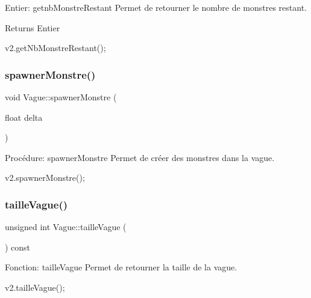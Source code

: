 Entier\+: getnb\+Monstre\+Restant Permet de retourner le nombre de monstres restant. 

\begin{DoxyReturn}{Returns}
Entier 
\begin{DoxyCode}
v2.getNbMonstreRestant();
\end{DoxyCode}
 
\end{DoxyReturn}
\mbox{\label{classVague_a08f321266ddbf3e852b9d48975849f98}} 
\subsubsection{\texorpdfstring{spawner\+Monstre()}{spawnerMonstre()}}
{\footnotesize\ttfamily void Vague\+::spawner\+Monstre (\begin{DoxyParamCaption}\item[{float}]{delta }\end{DoxyParamCaption})}



Procédure\+: spawner\+Monstre Permet de créer des monstres dans la vague. 


\begin{DoxyCode}
v2.spawnerMonstre();
\end{DoxyCode}
 \mbox{\label{classVague_a00fd363241fbfd6ed6819d408155a6ee}} 
\subsubsection{\texorpdfstring{taille\+Vague()}{tailleVague()}}
{\footnotesize\ttfamily unsigned int Vague\+::taille\+Vague (\begin{DoxyParamCaption}{ }\end{DoxyParamCaption}) const}



Fonction\+: taille\+Vague Permet de retourner la taille de la vague. 


\begin{DoxyCode}
v2.tailleVague();
\end{DoxyCode}
 \mbox{\label{classVague_aaa31d3deb82c73be899c478a55a6724f}} 
